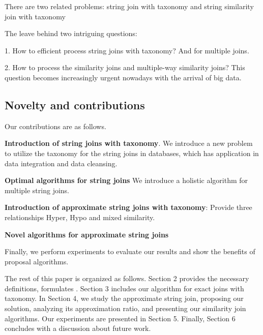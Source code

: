 There are two related problems: string join with taxonomy and string similarity join with taxonomy

The leave behind two intriguing questions:

1. How to efficient process string joins with taxonomy? And for multiple joins.


2. How to process the similarity joins and multiple-way similarity joins?  This question becomes increasingly urgent nowadays with the arrival of big data.





\subsection{Novelty and contributions}


\smallskip


Our contributions are as follows.

\noindent \textbf{Introduction of string joins with taxonomy}. We introduce a new problem to utilize the taxonomy for the string joins in databases, which has application in data integration and data cleansing.

\noindent \textbf{Optimal algorithms for string joins} We introduce a holistic algorithm for multiple string joins.

\noindent \textbf{Introduction of approximate string joins with taxonomy}: Provide three relationships Hyper, Hypo and mixed similarity.

\noindent \textbf{Novel algorithms for approximate string joins}


Finally, we perform experiments to evaluate our results and show the benefits of proposal algorithms.


\smallskip

The rest of this paper is organized as follows. Section 2
provides the necessary definitions, formulates . Section
3 includes our algorithm for exact joins with taxonomy. In Section 4, we study
the approximate string join, proposing our solution, analyzing its approximation
ratio, and presenting our similarity join algorithms.
Our experiments are presented in Section 5. Finally,
Section 6 concludes with a discussion about future work.